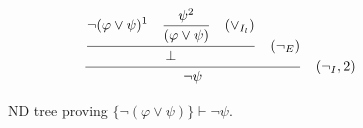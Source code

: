 \begin{figure}[h]
    \centering
    \[
    \frac{\displaystyle \frac{
    \displaystyle \neg (\varphi \lor \psi)^1 \quad \displaystyle \frac{\psi^2}{(\varphi \lor \psi) \strut} \quad (\lor_{I_l}) \strut}
    {\displaystyle \bot \strut} \quad (\displaystyle \neg_E)\strut} {\displaystyle \neg \psi \strut} \quad (\neg_I, 2)
    \]
    \caption{ND tree proving \( \{\neg (\varphi \lor \psi)\} \vdash \neg \psi \).}
    \label{tab:proof-tree}
\end{figure}
\vspace{-10px}
%
